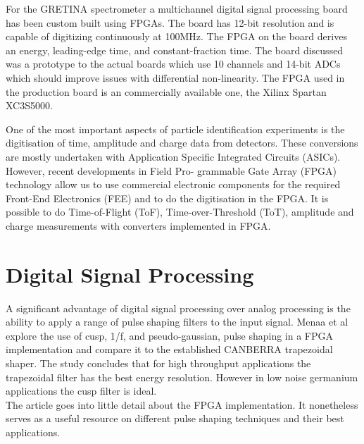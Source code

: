 \documentclass[12pt]{article}
\begin{document}
{\large\textbf{\cite{Cromaz2008233}}}

For the GRETINA spectrometer a multichannel digital signal processing board has been custom built using FPGAs. The board has 12-bit resolution and is capable of digitizing continuously at 100MHz. The FPGA on the board derives an energy, leading-edge time, and constant-fraction time. The board discussed was a prototype to the actual boards which use 10 channels and 14-bit ADCs which should improve issues with differential non-linearity. The FPGA used in the production board is an commercially available one, the Xilinx Spartan XC3S5000.
\\[20pt]


{\large\textbf{\cite{Ugur}}}

One of the most important aspects of particle identification experiments is the digitisation of time, amplitude and charge data from detectors. These conversions are mostly undertaken with Application Specific Integrated Circuits (ASICs). However, recent developments in Field Pro- grammable Gate Array (FPGA) technology allow us to use commercial electronic components for the required Front-End Electronics (FEE) and to do the digitisation in the FPGA. It is possible to do Time-of-Flight (ToF), Time-over-Threshold (ToT), amplitude and charge measurements with converters implemented in FPGA. 
\\[20pt]


\section{Digital Signal Processing}   %


{\large\textbf{\cite{Menaa2011512}}}

A significant advantage of digital signal processing over analog processing is the ability to apply a range of pulse shaping filters to the input signal. Menaa et al explore the use of cusp, 1/f, and pseudo-gaussian, pulse shaping in a FPGA implementation and compare it to the established CANBERRA trapezoidal shaper. The study concludes that for high throughput applications the trapezoidal filter has the best energy resolution. However in low noise germanium applications the cusp filter is ideal.
\\
The article goes into little detail about the FPGA implementation. It nonetheless serves as a useful resource on different pulse shaping techniques and their best applications.
\\[20pt]
\end{document}
